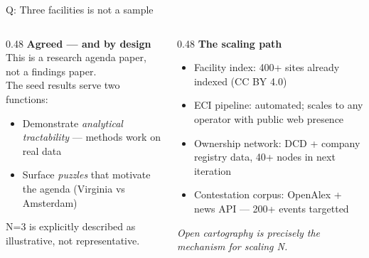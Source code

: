 \documentclass[aspectratio=169,11pt]{beamer}
\begin{document}
\begin{frame}[noframenumbering]{\enspace Q: Three facilities is not a sample}
\begin{columns}[T]
\begin{column}{0.48\textwidth}
  \small\textbf{Agreed — and by design}\\[0.4em]
  \footnotesize
  This is a research agenda paper, not a findings paper.\\[0.3em]
  The seed results serve two functions:
  \begin{itemize}
    \item Demonstrate \textit{analytical tractability} — methods work on real data
    \item Surface \textit{puzzles} that motivate the agenda (Virginia vs Amsterdam)
  \end{itemize}
  \vspace{0.3em}
  N=3 is explicitly described as illustrative, not representative.
\end{column}
\begin{column}{0.48\textwidth}
  \small\textbf{The scaling path}\\[0.4em]
  \footnotesize
  \begin{itemize}
    \item Facility index: 400+ sites already indexed (CC BY 4.0)
    \item ECI pipeline: automated; scales to any operator with public web presence
    \item Ownership network: DCD + company registry data, 40+ nodes in next iteration
    \item Contestation corpus: OpenAlex + news API — 200+ events targetted
  \end{itemize}
  \vspace{0.3em}
  \textcolor{dcgray}{\textit{Open cartography is precisely the mechanism for scaling N.}}
\end{column}
\end{columns}
\end{frame}
\end{document}

